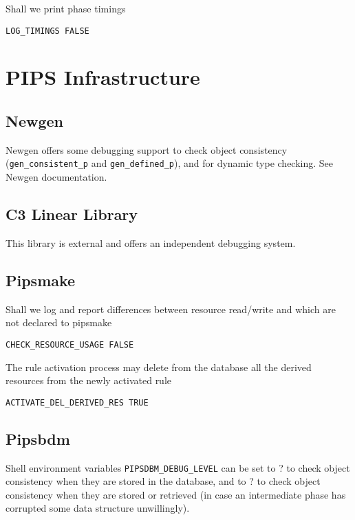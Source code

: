 Shall we print phase timings

\begin{verbatim}
LOG_TIMINGS FALSE
\end{verbatim}

\section{PIPS Infrastructure}
\label{section-pips-infrastructure}

\subsection{Newgen}

Newgen offers some debugging support to check object consistency
(\verb+gen_consistent_p+ and \verb+gen_defined_p+), and for dynamic type
checking. See Newgen documentation\cite{JT89}\cite{JT90}.

\subsection{C3 Linear Library}

This library is external and offers an independent debugging system.

\subsection{Pipsmake}

Shall we log and report differences between resource read/write and
which are not declared to pipsmake

\begin{verbatim}
CHECK_RESOURCE_USAGE FALSE
\end{verbatim}

The rule activation process may delete from the database all the
derived resources from the newly activated rule

\begin{verbatim}
ACTIVATE_DEL_DERIVED_RES TRUE
\end{verbatim}

\subsection{Pipsbdm}

Shell environment variables \verb+PIPSDBM_DEBUG_LEVEL+ can be set to ?
to check object consistency when they are stored in the database, and to
? to check object consistency when they are stored or retrieved (in case
an intermediate phase has corrupted some data structure unwillingly).

